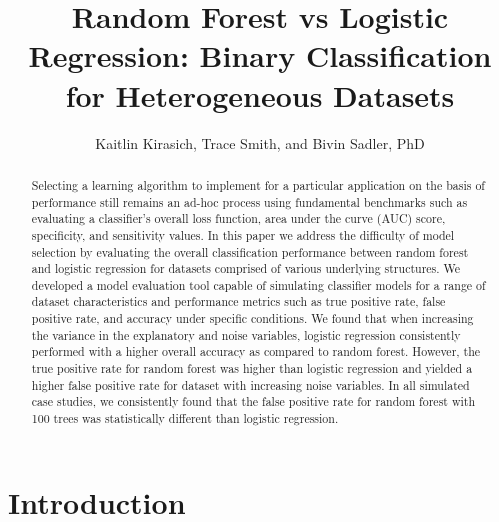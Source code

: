 \documentclass{llncs}
\title{\textbf{Random Forest vs Logistic Regression: Binary Classification for Heterogeneous Datasets}}
\author{Kaitlin Kirasich, Trace Smith, and Bivin Sadler, PhD}
\institute{Master of Science in Data Science \\ Southern Methodist University \\ Dallas, Texas USA \\
\email{kkirasich@smu.edu,traces@smu.edu,bsadler@smu.edu}}
\begin{document}
\maketitle

\begin{abstract} 
Selecting a learning algorithm to implement for a particular application on the basis of performance still remains an ad-hoc process using fundamental benchmarks such as evaluating a classifier’s overall loss function, area under the curve (AUC) score, specificity, and sensitivity values. In this paper we address the difficulty of model selection by evaluating the overall classification performance between random forest and logistic regression for datasets comprised of various underlying structures. We developed a model evaluation tool capable of simulating classifier models for a range of dataset characteristics and performance metrics such as true positive rate, false positive rate, and accuracy under specific conditions. We found that when increasing the variance in the explanatory and noise variables, logistic regression consistently performed with a higher overall accuracy as compared to random forest. However, the true positive rate for random forest was higher than logistic regression and yielded a higher false positive rate for dataset with increasing noise variables. In all simulated case studies, we consistently found that the false positive rate for random forest with 100 trees was statistically different than logistic regression. 

\end{abstract}


\section{Introduction}
\end{document}
